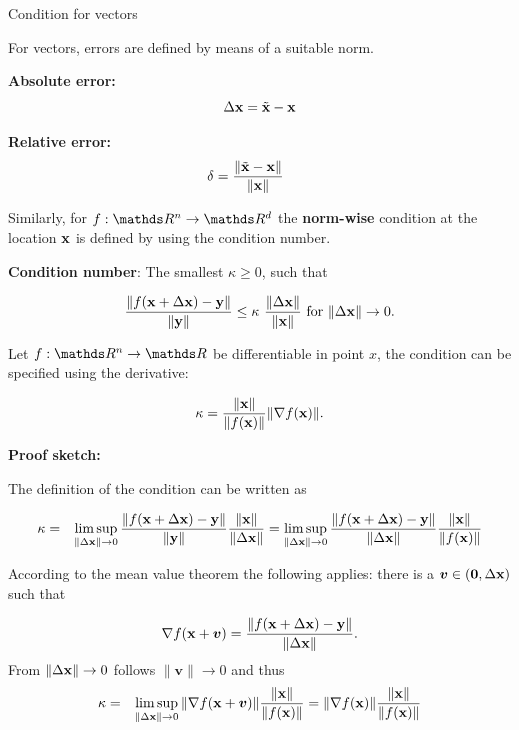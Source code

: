 \documentclass[11pt,compress,t,notes=noshow, xcolor=table]{beamer}
\begin{document}
\begin{vbframe}{Condition for vectors}

For vectors, errors are defined by means of a suitable norm.

\lz

\textbf{Absolute error:}
$$
  \Delta \mathbf{x} = \tilde{\mathbf{x}} - \mathbf{x}
$$

\textbf{Relative error:}
$$
  \delta = \frac{\|\tilde{\mathbf{x}} - \mathbf{x} \|}{\|\mathbf{x}\|} \qquad
$$

Similarly, for $f:\R^n \rightarrow \R^d$ the \textbf{norm-wise} condition at the location $\mathbf{x}$ is defined by using the condition number.

\lz

%

\textbf{Condition number}: The smallest $\kappa \geq 0$, such that

$$
\frac{\|f(\mathbf{x}+\Delta \mathbf{x})-\mathbf{y}\|}{\|\mathbf{y}\|} \leq \kappa \ \frac{\|\Delta \mathbf{x}\|}{\|\mathbf{x}\|} \text{ for } \|\Delta \mathbf{x}\| \to 0.
$$

Let $f: \R^n \to \R$ be differentiable in point $x$, the condition can be specified using the derivative:

\vspace*{-.3cm}
$$
\kappa =  \frac{\|\mathbf{x}\|}{\|f(\mathbf{x})\|} \|\nabla f(\mathbf{x})\|.
$$

\lz
\vspace*{0.5cm}
\begin{footnotesize}
\textbf{Proof sketch:}

The definition of the condition can be written as

\vspace*{-.3cm}
\begin{eqnarray*}
\kappa &=& \limsup_{\|\Delta \mathbf{x}\| \to 0} \frac{\|f(\mathbf{x} + \Delta \mathbf{x})-\mathbf{y}\|}{\|\mathbf{y}\|} \frac{\|\mathbf{x}\|}{\|\Delta \mathbf{x}\|}  = \limsup_{\|\Delta \mathbf{x}\|\to 0} \frac{\|f(\mathbf{x} + \Delta \mathbf{x})-\mathbf{y}\|}{\|\Delta \mathbf{x}\|} \frac{\|\mathbf{x}\|}{\|f(\mathbf{x})\|} 
\end{eqnarray*}

According to the mean value theorem the following applies: there is a $\bm{v} \in (\bm{0}, \Delta \mathbf{x})$ such that

$$
\nabla f(\mathbf{x} + \bm{v}) = \frac{\|f(\mathbf{x} + \Delta \mathbf{x})-\mathbf{y}\|}{\|\Delta \mathbf{x}\|}.
$$
\vspace*{0.5cm}
From $\|\Delta \mathbf{x}\| \to 0$ follows $\|\bm{v}\|\to 0$ and thus
\begin{eqnarray*}
\kappa &=& \limsup_{\|\Delta \mathbf{x}\| \to 0} \|\nabla f(\mathbf{x} + \bm{v})\| \frac{\|\mathbf{x}\|}{\|f(\mathbf{x})\|} = \|\nabla f(\mathbf{x})\| \frac{\|\mathbf{x}\|}{\|f(\mathbf{x})\|}
\end{eqnarray*}
\end{footnotesize}



\end{vbframe}
\end{document}

